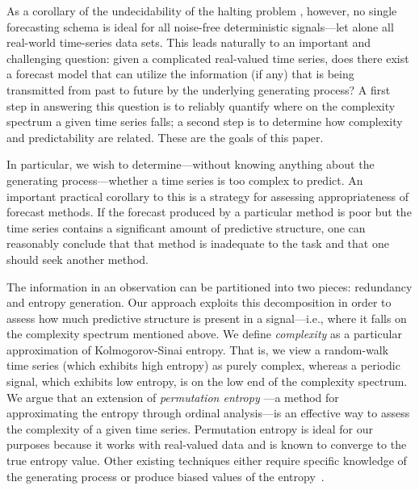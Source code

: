 As a corollary of the undecidability of the halting problem
\cite{halting-problem}, however, no single forecasting schema is ideal
for all noise-free deterministic signals\cite{weigend-book}---let
alone all real-world time-series data sets.  This leads naturally to
an important and challenging question: given a complicated real-valued
time series, does there exist a forecast model that can utilize the
information (if any) that is being transmitted from past to future by
the underlying generating process?  A first step in answering this
question is to reliably quantify where on the complexity spectrum a
given time series falls; a second step is to determine how complexity
and predictability are related.  These are the goals of this paper.

In particular, we wish to determine---without knowing anything about
the generating process---whether a time series is too complex to
predict.  An important practical corollary to this is a strategy for
assessing appropriateness of forecast methods.  If the forecast
produced by a particular method is poor but the time series contains a
significant amount of predictive structure, one can reasonably conclude that that method is inadequate
to the task and that one should seek another method.    

The information in an observation can be partitioned into two pieces:
redundancy and entropy generation\cite{crutchfield2003}.  Our approach
exploits this decomposition in order to assess how much predictive
structure is present in a signal---i.e., where it falls on the
complexity spectrum mentioned above.  We define \emph{complexity} as a
particular approximation of Kolmogorov-Sinai entropy\cite{KS-entropy}.
That is, we view a random-walk time series (which exhibits high
entropy) as purely complex, whereas a periodic signal, which exhibits
low entropy, is on the low end of the complexity spectrum.  We argue
that an extension of \emph{permutation entropy}
\cite{bandt2002per}---a method for approximating the entropy through
ordinal analysis---is an effective way to assess the complexity of a
given time series.  Permutation entropy is ideal for our purposes
because it works with real-valued data and is known to converge to the true entropy value. Other
existing techniques either require specific knowledge of the
generating process or produce biased values of the
entropy~\cite{bollt2001}.

